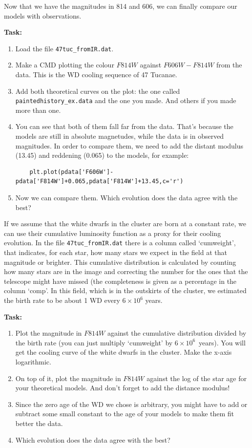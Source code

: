 \documentclass{article}
\begin{document}
Now that we have the magnitudes in 814 and 606, we can finally compare our models with observations.

\textbf{Task:}\vspace{-1em}
\begin{enumerate}
\item Load the file \texttt{47tuc\_fromIR.dat}.
\item Make a CMD plotting the colour $F814W$ against $F606W-F814W$ from the data. This is the WD cooling sequence of 47 Tucanae.
\item Add both theoretical curves on the plot: the one called \texttt{paintedhistory\_ex.data} and the one you made. And others if you made more than one.
\item You can see that both of them fall far from the data. That's because the models are still in absolute magnetudes, while the data is in observed magnitudes. In order to compare them, we need to add the distant modulus (13.45) and reddening (0.065) to the models, for example:
\begin{verbatim}
    plt.plot(pdata['F606W']-pdata['F814W']+0.065,pdata['F814W']+13.45,c='r')
\end{verbatim}
\item Now we can compare them. Which evolution does the data agree with the best?
\end{enumerate}

If we assume that the white dwarfs in the cluster are born at a constant rate, we can use their cumulative luminosity function as a proxy for their cooling evolution. In the file \texttt{47tuc\_fromIR.dat} there is a column called `cumweight', that indicates, for each star, how many stars we expect in the field at that magnitude or brighter.  This cumulative distribution is calculated by counting how many stars are in the image and correcting the number for the ones that the telescope might have missed (the completeness is given as a percentage in the column `comp'. In this field, which is in the outskirts of the cluster, we estimated the birth rate to be about 1 WD every $6 \times 10^6$ years.

\textbf{Task:}\vspace{-1em}
\begin{enumerate}
\item Plot the magnitude in $F814W$ against the cumulative distribution divided by the birth rate (you can just multiply `cumweight' by $6 \times 10^6$~years). You will get the cooling curve of the white dwarfs in the cluster. Make the x-axis logarithmic.
\item On top of it, plot the magnitude in $F814W$ against the log of the star age for your theoretical models. And don't forget to add the distance modulus!
\item Since the zero age of the WD we chose is arbitrary, you might have to add or subtract some small constant to the age of your models to make them fit better the data. 
\item Which evolution does the data agree with the best?
\end{enumerate}
\end{document}
